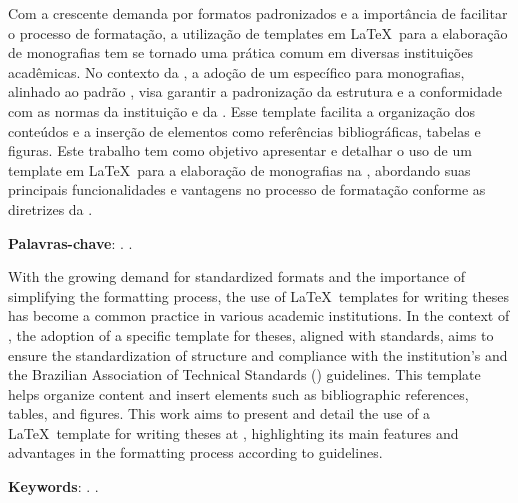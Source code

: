 \setlength{\absparsep}{18pt} %

\begin{resumo}
	Com a crescente demanda por formatos padronizados e a importância de facilitar o processo de formatação, a utilização de templates em \LaTeX\ para a elaboração de monografias tem se tornado uma prática comum em diversas instituições acadêmicas.
	No contexto da \ufma, a adoção de um \template específico para monografias, alinhado ao padrão \abnt, visa garantir a padronização da estrutura e a conformidade com as normas da instituição e da \abntfull.
	Esse template facilita a organização dos conteúdos e a inserção de elementos como referências bibliográficas, tabelas e figuras.
	Este trabalho tem como objetivo apresentar e detalhar o uso de um template em \LaTeX\ para a elaboração de monografias na \ufma, abordando suas principais funcionalidades e vantagens no processo de formatação conforme as diretrizes da \abnt.

	\textbf{Palavras-chave}: \abnt. \ufma.
\end{resumo}

\begin{resumo}[Abstract]
	With the growing demand for standardized formats and the importance of simplifying the formatting process, the use of \LaTeX\ templates for writing theses has become a common practice in various academic institutions.
	In the context of \ufma, the adoption of a specific template for theses, aligned with \abnt standards, aims to ensure the standardization of structure and compliance with the institution's and the Brazilian Association of Technical Standards (\abnt) guidelines.
	This template helps organize content and insert elements such as bibliographic references, tables, and figures.
	This work aims to present and detail the use of a \LaTeX\ template for writing theses at \ufma, highlighting its main features and advantages in the formatting process according to \abnt guidelines.

	\textbf{Keywords}: \abnt. \ufma.
\end{resumo}
